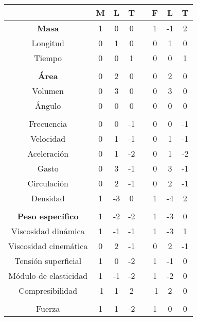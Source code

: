 \begin{table}[h!]
    \centering
    \begin{tabular}{@{}cccccccc@{}}
    \toprule
                             & M  & L  & T  &  & F  & L  & T  \\ \midrule
    \textbf{Masa}            & 1  & 0  & 0  &  & 1  & -1 & 2  \\
    Longitud                 & 0  & 1  & 0  &  & 0  & 1  & 0  \\
    Tiempo                   & 0  & 0  & 1  &  & 0  & 0  & 1  \\
                             &    &    &    &  &    &    &    \\
    \textbf{Área}            & 0  & 2  & 0  &  & 0  & 2  & 0  \\
    Volumen                  & 0  & 3  & 0  &  & 0  & 3  & 0  \\
    Ángulo                   & 0  & 0  & 0  &  & 0  & 0  & 0  \\
                             &    &    &    &  &    &    &    \\
    Frecuencia               & 0  & 0  & -1 &  & 0  & 0  & -1 \\
    Velocidad                & 0  & 1  & -1 &  & 0  & 1  & -1 \\
    Aceleración              & 0  & 1  & -2 &  & 0  & 1  & -2 \\
    Gasto                    & 0  & 3  & -1 &  & 0  & 3  & -1 \\
    Circulación              & 0  & 2  & -1 &  & 0  & 2  & -1 \\
    Densidad                 & 1  & -3 & 0  &  & 1  & -4 & 2  \\
                             &    &    &    &  &    &    &    \\
    \textbf{Peso específico} & 1  & -2 & -2 &  & 1  & -3 & 0  \\
    Viscosidad dinámica      & 1  & -1 & -1 &  & 1  & -3 & 1  \\
    Viscosidad cinemática    & 0  & 2  & -1 &  & 0  & 2  & -1 \\
    Tensión superficial      & 1  & 0  & -2 &  & 1  & -1 & 0  \\
    Módulo de elasticidad    & 1  & -1 & -2 &  & 1  & -2 & 0  \\
    Compresibilidad          & -1 & 1  & 2  &  & -1 & 2  & 0  \\
                             &    &    &    &  &    &    &    \\
    Fuerza                   & 1  & 1  & -2 &  & 1  & 0  & 0  \\

\end{tabular}
\end{table}
